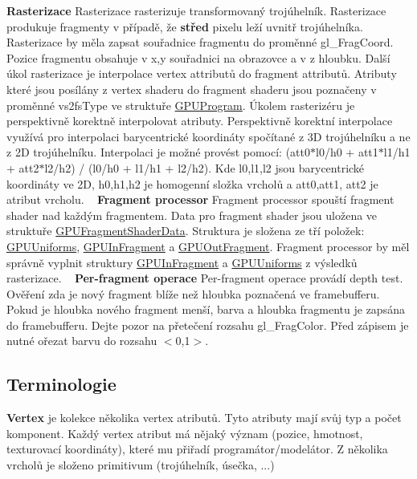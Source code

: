  {\bfseries Rasterizace} Rasterizace rasterizuje transformovaný trojúhelník. Rasterizace produkuje fragmenty v případě, že {\bfseries střed} pixelu leží uvnitř trojúhelníka. Rasterizace by měla zapsat souřadnice fragmentu do proměnné gl\+\_\+\+Frag\+Coord. Pozice fragmentu obsahuje v x,y souřadnici na obrazovce a v z hloubku. Další úkol rasterizace je interpolace vertex attributů do fragment attributů. Atributy které jsou posílány z vertex shaderu do fragment shaderu jsou poznačeny v proměnné vs2fs\+Type ve struktuře \hyperlink{structGPUProgram}{G\+P\+U\+Program}. Úkolem rasterizéru je perspektivně korektně interpolovat atributy. Perspektivně korektní interpolace využívá pro interpolaci barycentrické koordináty spočítané z 3D trojúhelníku a ne z 2D trojúhelníku. Interpolaci je možné provést pomocí\+: (att0$\ast$l0/h0 + att1$\ast$l1/h1 + att2$\ast$l2/h2) / (l0/h0 + l1/h1 + l2/h2). Kde l0,l1,l2 jsou barycentrické koordináty ve 2D, h0,h1,h2 je homogenní složka vrcholů a att0,att1, att2 je atribut vrcholu. ~\newline
 {\bfseries Fragment processor} Fragment processor spouští fragment shader nad každým fragmentem. Data pro fragment shader jsou uložena ve struktuře \hyperlink{structGPUFragmentShaderData}{G\+P\+U\+Fragment\+Shader\+Data}. Struktura je složena ze tří položek\+: \hyperlink{structGPUUniforms}{G\+P\+U\+Uniforms}, \hyperlink{structGPUInFragment}{G\+P\+U\+In\+Fragment} a \hyperlink{structGPUOutFragment}{G\+P\+U\+Out\+Fragment}. Fragment processor by měl správně vyplnit struktury \hyperlink{structGPUInFragment}{G\+P\+U\+In\+Fragment} a \hyperlink{structGPUUniforms}{G\+P\+U\+Uniforms} z výsledků rasterizace. ~\newline
 {\bfseries Per-\/fragment operace} Per-\/fragment operace provádí depth test. Ověření zda je nový fragment blíže než hloubka poznačená ve framebufferu. Pokud je hloubka nového fragment menší, barva a hloubka fragmentu je zapsána do framebufferu. Dejte pozor na přetečení rozsahu gl\+\_\+\+Frag\+Color. Před zápisem je nutné ořezat barvu do rozsahu $<$0,1$>$. ~\newline
\hypertarget{index_terminologie}{}\subsection{Terminologie}\label{index_terminologie}
{\bfseries Vertex} je kolekce několika vertex atributů. Tyto atributy mají svůj typ a počet komponent. Každý vertex atribut má nějaký význam (pozice, hmotnost, texturovací koordináty), které mu přiřadí programátor/modelátor. Z několika vrcholů je složeno primitivum (trojúhelník, úsečka, ...)

